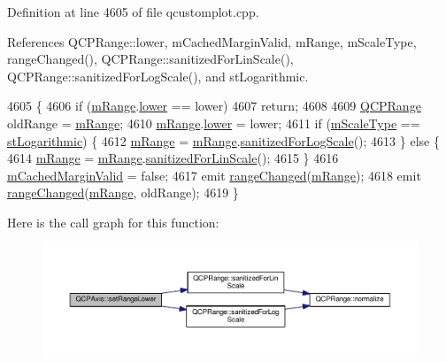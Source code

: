 Definition at line 4605 of file qcustomplot.\+cpp.



References Q\+C\+P\+Range\+::lower, m\+Cached\+Margin\+Valid, m\+Range, m\+Scale\+Type, range\+Changed(), Q\+C\+P\+Range\+::sanitized\+For\+Lin\+Scale(), Q\+C\+P\+Range\+::sanitized\+For\+Log\+Scale(), and st\+Logarithmic.


\begin{DoxyCode}
4605                                         \{
4606   \textcolor{keywordflow}{if} (\hyperlink{class_q_c_p_axis_a1ee36773c49062d751560e11f90845f7}{mRange}.\hyperlink{class_q_c_p_range_aa3aca3edb14f7ca0c85d912647b91745}{lower} == lower)
4607     \textcolor{keywordflow}{return};
4608 
4609   \hyperlink{class_q_c_p_range}{QCPRange} oldRange = \hyperlink{class_q_c_p_axis_a1ee36773c49062d751560e11f90845f7}{mRange};
4610   \hyperlink{class_q_c_p_axis_a1ee36773c49062d751560e11f90845f7}{mRange}.\hyperlink{class_q_c_p_range_aa3aca3edb14f7ca0c85d912647b91745}{lower} = lower;
4611   \textcolor{keywordflow}{if} (\hyperlink{class_q_c_p_axis_ad706039549cbbbec5fcb2baf7894e04d}{mScaleType} == \hyperlink{class_q_c_p_axis_a36d8e8658dbaa179bf2aeb973db2d6f0abf5b785ad976618816dc6f79b73216d4}{stLogarithmic}) \{
4612     \hyperlink{class_q_c_p_axis_a1ee36773c49062d751560e11f90845f7}{mRange} = \hyperlink{class_q_c_p_axis_a1ee36773c49062d751560e11f90845f7}{mRange}.\hyperlink{class_q_c_p_range_aaf6a9046e78d91eeb8e89584fe46b034}{sanitizedForLogScale}();
4613   \} \textcolor{keywordflow}{else} \{
4614     \hyperlink{class_q_c_p_axis_a1ee36773c49062d751560e11f90845f7}{mRange} = \hyperlink{class_q_c_p_axis_a1ee36773c49062d751560e11f90845f7}{mRange}.\hyperlink{class_q_c_p_range_a1ff029704c29a75adbc1dc36cecaf44c}{sanitizedForLinScale}();
4615   \}
4616   \hyperlink{class_q_c_p_axis_a2cde37b6e385f47e11322df4ac1b0e9b}{mCachedMarginValid} = \textcolor{keyword}{false};
4617   emit \hyperlink{class_q_c_p_axis_a0894084e4c16a1736534c4095746f910}{rangeChanged}(\hyperlink{class_q_c_p_axis_a1ee36773c49062d751560e11f90845f7}{mRange});
4618   emit \hyperlink{class_q_c_p_axis_a0894084e4c16a1736534c4095746f910}{rangeChanged}(\hyperlink{class_q_c_p_axis_a1ee36773c49062d751560e11f90845f7}{mRange}, oldRange);
4619 \}
\end{DoxyCode}


Here is the call graph for this function\+:\nopagebreak
\begin{figure}[H]
\begin{center}
\leavevmode
\includegraphics[width=350pt]{class_q_c_p_axis_afcf51227d337db28d1a9ce9a4d1bc91a_cgraph}
\end{center}
\end{figure}


